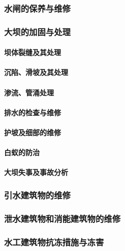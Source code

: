 \documentclass[UTF8]{../../ApplicationUniverse}
\begin{document}
        \subsubsection{水闸的保养与维修}
        \subsubsection{大坝的加固与处理}
            \paragraph{坝体裂缝及其处理}
            \paragraph{沉陷、滑坡及其处理}
            \paragraph{渗流、管涌处理}
            \paragraph{排水的检查与维修}
            \paragraph{护坡及细部的维修}
            \paragraph{白蚁的防治}
            \paragraph{大坝失事及事故分析}
        \subsubsection{引水建筑物的维修}
        \subsubsection{泄水建筑物和消能建筑物的维修}
        \subsubsection{水工建筑物抗冻措施与冻害}
\end{document}
